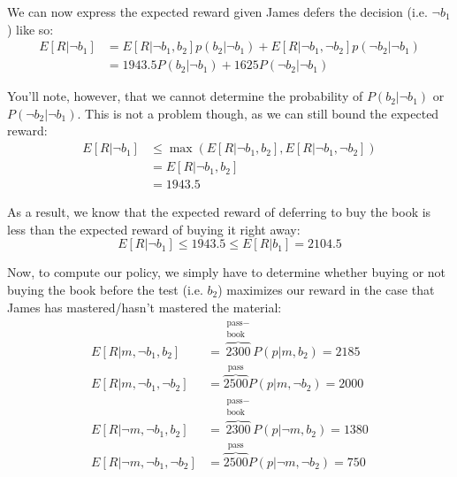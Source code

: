 \documentclass{article}
\begin{document}

We can now express the expected reward given James defers the decision (i.e. $\neg b_1$) like so:
\begin{align*}
E[R|\neg b_1]&=E[R|\neg b_1, b_2]p(b_2|\neg b_1)+E[R|\neg b_1,\neg b_2]p(\neg b_2|\neg b_1)\\
&=1943.5P(b_2|\neg b_1)+1625P(\neg b_2|\neg b_1)
\end{align*}

You'll note, however, that we cannot determine the probability of $P(b_2|\neg b_1)$ or $P(\neg b_2|\neg b_1)$. This is not a problem though, as we can still bound the expected reward:
\begin{align*}
E[R|\neg b_1]&\le \operatorname{max}(E[R|\neg b_1, b_2], E[R|\neg b_1,\neg b_2])\\
&=E[R|\neg b_1, b_2]\\
&=1943.5
\end{align*}

As a result, we know that the expected reward of deferring to buy the book is less than the expected reward of buying it right away:
$$E[R|\neg b_1]\le 1943.5\le E[R|b_1]=2104.5$$
\newpage

Now, to compute our policy, we simply have to determine whether buying or not buying the book before the test (i.e. $b_2$) maximizes our reward in the case that James has mastered/hasn't mastered the material:
\begin{align*}
  E[R|m,\neg b_1,b_2]&=\overbrace{2300}^{\substack{\text{pass}-\\\text{book}}}P(p|m,b_2)=2185\\
  E[R|m,\neg b_1,\neg b_2]&=\overbrace{2500}^{\text{pass}}P(p|m,\neg b_2)=2000\\
  E[R|\neg m,\neg b_1,b_2]&=\overbrace{2300}^{\substack{\text{pass}-\\\text{book}}}P(p|\neg m,b_2)=1380\\
  E[R|\neg m,\neg b_1,\neg b_2]&=\overbrace{2500}^{\text{pass}}P(p|\neg m,\neg b_2)=750
\end{align*}
\end{document}
